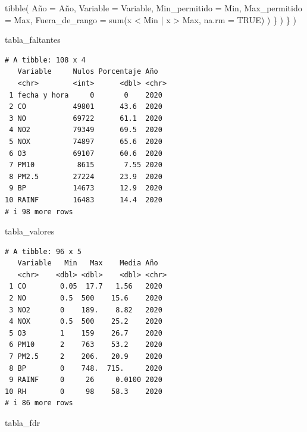 \documentclass[
  letterpaper,
  DIV=11,
  numbers=noendperiod]{scrartcl}
\newenvironment{Shaded}{\begin{snugshade}}{\end{snugshade}}
\newcommand{\AttributeTok}[1]{\textcolor[rgb]{0.40,0.45,0.13}{#1}}
\newcommand{\ConstantTok}[1]{\textcolor[rgb]{0.56,0.35,0.01}{#1}}
\newcommand{\FunctionTok}[1]{\textcolor[rgb]{0.28,0.35,0.67}{#1}}
\newcommand{\NormalTok}[1]{\textcolor[rgb]{0.00,0.23,0.31}{#1}}
\newcommand{\OtherTok}[1]{\textcolor[rgb]{0.00,0.23,0.31}{#1}}
\newcommand{\SpecialCharTok}[1]{\textcolor[rgb]{0.37,0.37,0.37}{#1}}
\begin{document}
\begin{Shaded}
\begin{Highlighting}[]
        \FunctionTok{tibble}\NormalTok{(}
\NormalTok{          Año }\OtherTok{=}\NormalTok{ Año,}
          \AttributeTok{Variable =}\NormalTok{ Variable,}
          \AttributeTok{Min\_permitido =}\NormalTok{ Min,}
          \AttributeTok{Max\_permitido =}\NormalTok{ Max,}
          \AttributeTok{Fuera\_de\_rango =} \FunctionTok{sum}\NormalTok{(x }\SpecialCharTok{\textless{}}\NormalTok{ Min }\SpecialCharTok{|}\NormalTok{ x }\SpecialCharTok{\textgreater{}}\NormalTok{ Max, }\AttributeTok{na.rm =} \ConstantTok{TRUE}\NormalTok{)}
\NormalTok{        )}
\NormalTok{      \}}
\NormalTok{    )}
\NormalTok{  \}}
\NormalTok{)}

\NormalTok{tabla\_faltantes}
\end{Highlighting}
\end{Shaded}

\begin{verbatim}
# A tibble: 108 x 4
   Variable     Nulos Porcentaje Año  
   <chr>        <int>      <dbl> <chr>
 1 fecha y hora     0       0    2020 
 2 CO           49801      43.6  2020 
 3 NO           69722      61.1  2020 
 4 NO2          79349      69.5  2020 
 5 NOX          74897      65.6  2020 
 6 O3           69107      60.6  2020 
 7 PM10          8615       7.55 2020 
 8 PM2.5        27224      23.9  2020 
 9 BP           14673      12.9  2020 
10 RAINF        16483      14.4  2020 
# i 98 more rows
\end{verbatim}

\begin{Shaded}
\begin{Highlighting}[]
\NormalTok{tabla\_valores}
\end{Highlighting}
\end{Shaded}

\begin{verbatim}
# A tibble: 96 x 5
   Variable   Min   Max    Media Año  
   <chr>    <dbl> <dbl>    <dbl> <chr>
 1 CO        0.05  17.7   1.56   2020 
 2 NO        0.5  500    15.6    2020 
 3 NO2       0    189.    8.82   2020 
 4 NOX       0.5  500    25.2    2020 
 5 O3        1    159    26.7    2020 
 6 PM10      2    763    53.2    2020 
 7 PM2.5     2    206.   20.9    2020 
 8 BP        0    748.  715.     2020 
 9 RAINF     0     26     0.0100 2020 
10 RH        0     98    58.3    2020 
# i 86 more rows
\end{verbatim}

\begin{Shaded}
\begin{Highlighting}[]
\NormalTok{tabla\_fdr}
\end{Highlighting}
\end{Shaded}
\end{document}
